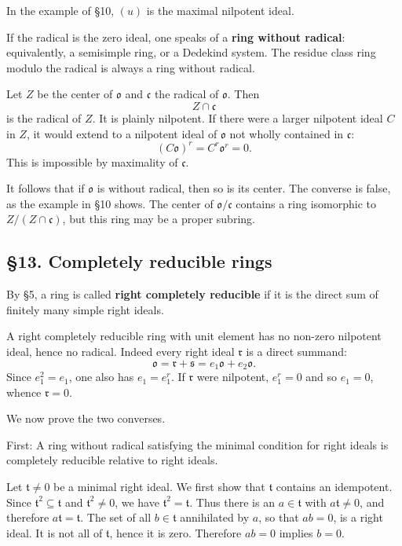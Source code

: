 \documentclass[
  11pt,
]{article}
\begin{document}
In the example of §10, \((u)\) is the maximal nilpotent ideal.

If the radical is the zero ideal, one speaks of a \textbf{ring without
radical}: equivalently, a semisimple ring, or a Dedekind system. The
residue class ring modulo the radical is always a ring without radical.

Let \(Z\) be the center of \(\mathfrak{o}\) and \(\mathfrak c\) the
radical of \(\mathfrak{o}\). Then \[
  Z\cap\mathfrak c
\] is the radical of \(Z\). It is plainly nilpotent. If there were a
larger nilpotent ideal \(C\) in \(Z\), it would extend to a nilpotent
ideal of \(\mathfrak{o}\) not wholly contained in \(\mathfrak c\): \[
  (C\mathfrak{o})^r=C^r\mathfrak{o}^r=0.
\] This is impossible by maximality of \(\mathfrak c\).

It follows that if \(\mathfrak{o}\) is without radical, then so is its
center. The converse is false, as the example in §10 shows. The center
of \(\mathfrak{o}/\mathfrak c\) contains a ring isomorphic to
\(Z/(Z\cap\mathfrak c)\), but this ring may be a proper subring.

\subsection{§13. Completely reducible
rings}\label{completely-reducible-rings}

By §5, a ring is called \textbf{right completely reducible} if it is the
direct sum of finitely many simple right ideals.

A right completely reducible ring with unit element has no non-zero
nilpotent ideal, hence no radical. Indeed every right ideal
\(\mathfrak r\) is a direct summand: \[
  \mathfrak{o}=\mathfrak r+\mathfrak s=e_1\mathfrak{o}+e_2\mathfrak{o}.
\] Since \(e_1^2=e_1\), one also has \(e_1=e_1^r\). If \(\mathfrak r\)
were nilpotent, \(e_1^r=0\) and so \(e_1=0\), whence \(\mathfrak r=0\).

We now prove the two converses.

First: A ring without radical satisfying the minimal condition for right
ideals is completely reducible relative to right ideals.

Let \(\mathfrak t\ne0\) be a minimal right ideal. We first show that
\(\mathfrak t\) contains an idempotent. Since
\(\mathfrak t^2\subseteq\mathfrak t\) and \(\mathfrak t^2\ne0\), we have
\(\mathfrak t^2=\mathfrak t\). Thus there is an \(a\in\mathfrak t\) with
\(a\mathfrak t\ne0\), and therefore \(a\mathfrak t=\mathfrak t\). The
set of all \(b\in\mathfrak t\) annihilated by \(a\), so that \(ab=0\),
is a right ideal. It is not all of \(\mathfrak t\), hence it is zero.
Therefore \(ab=0\) implies \(b=0\).
\end{document}
